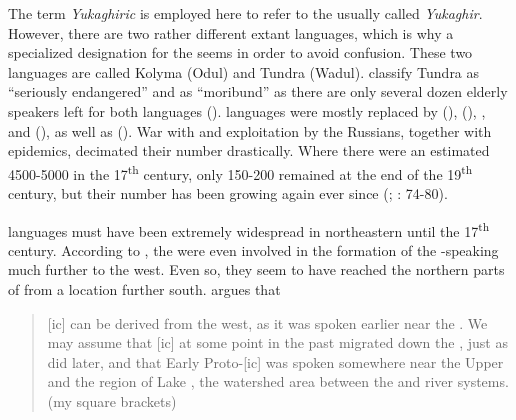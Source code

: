 The term \textit{Yukaghiric} is employed here to refer to the  usually called \textit{Yukaghir}. However, there are two rather different extant  languages, which is why a specialized designation for the  seems in order to avoid confusion. These two languages are called Kolyma  (Odul) and Tundra  (Wadul). \citet{TsumagariKurebitoEndo2007} classify Tundra  as “seriously endangered” and   as “moribund” as there are only several dozen elderly speakers left for both languages (\citealt[130]{Matić2014}).  languages were mostly replaced by  (),  (), , and  (), as well as  (). War with and exploitation by the Russians, together with  epidemics, decimated their number drastically. Where there were an estimated 4500-5000  in the 17\textsuperscript{th} century, only 150-200 remained at the end of the 19\textsuperscript{th} century, but their number has been growing again ever since (\citealt[3]{Rédei1999}; \citealt{Forsyth1992}: 74-80).

 languages must have been extremely widespread in northeastern  until the 17\textsuperscript{th} century. According to \citet{VolodkoStarikovskaya2008}, the  were even involved in the formation of the -speaking  much further to the west. Even so, they seem to have reached the northern parts of  from a location further south. \cite[93]{Häkkinen2012} argues that

\begin{quote}
[ic] can be derived from the west, as it was spoken earlier near the . We may assume that [ic] at some point in the past migrated down the , just as  did later, and that Early Proto-[ic] was spoken somewhere near the Upper  and the region of Lake , the watershed area between the  and  river systems. (my square brackets)
\end{quote}

